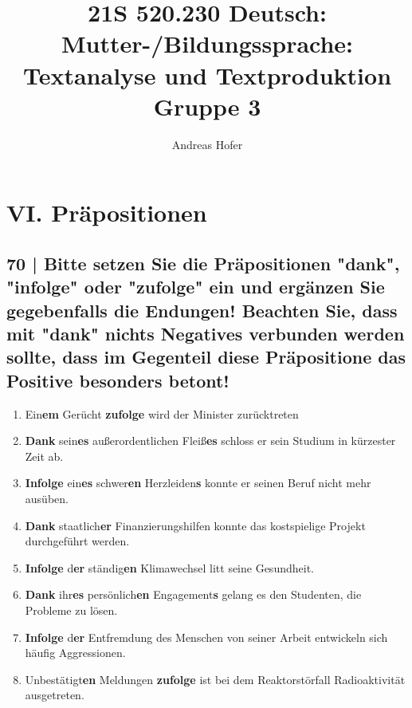 \documentclass{article}
\title{\vspace{-3cm}21S 520.230 Deutsch: Mutter-/Bildungssprache: Textanalyse und Textproduktion Gruppe 3}
\author{Andreas Hofer}
\begin{document}
	\section*{\textbf{VI. Präpositionen}}
	\subsection*{\textbf{70} | Bitte setzen Sie die Präpositionen "dank", "infolge" oder "zufolge" ein und ergänzen Sie gegebenfalls die Endungen! Beachten Sie, dass mit "dank" nichts Negatives verbunden werden sollte, dass im Gegenteil diese Präpositione das Positive besonders betont!}
	\begin{enumerate}
		\item{Ein\textbf{em} Gerücht \textbf{zufolge} wird der Minister zurücktreten}
		\item{\textbf{Dank} sein\textbf{es} außerordentlichen Fleiß\textbf{es} schloss er sein Studium in kürzester Zeit ab.}
		\item{\textbf{Infolge} ein\textbf{es} schwer\textbf{en} Herzleiden\textbf{s} konnte er seinen Beruf nicht mehr ausüben.}
		\item{\textbf{Dank} staatlich\textbf{er} Finanzierungshilfen konnte das kostspielige Projekt durchgeführt werden.}
		\item{\textbf{Infolge} d\textbf{er} ständig\textbf{en} Klimawechsel litt seine Gesundheit.}
		\item{\textbf{Dank} ihr\textbf{es} persönlich\textbf{en} Engagement\textbf{s} gelang es den Studenten, die Probleme zu lösen.}
		\item{\textbf{Infolge} d\textbf{er} Entfremdung des Menschen von seiner Arbeit entwickeln sich häufig Aggressionen.}
		\item{Unbestätigt\textbf{en} Meldungen \textbf{zufolge} ist bei dem Reaktorstörfall Radioaktivität ausgetreten.}
	\end{enumerate}
\end{document}

